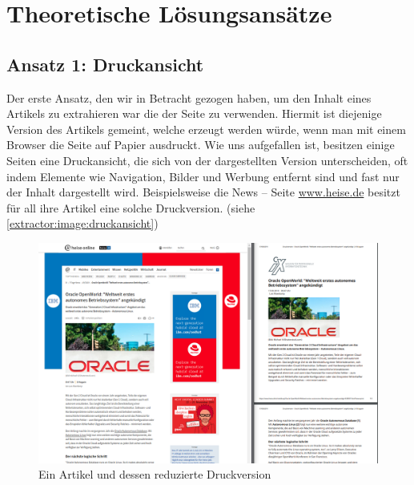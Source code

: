 \section{Theoretische Lösungsansätze}
\subsection[Die reduzierte Druckansicht]{Ansatz 1: Druckansicht}%
\label{extractor:ansatz:subsec1}
Der erste Ansatz, den wir in Betracht gezogen haben, um den Inhalt eines Artikels zu extrahieren war die  der Seite zu verwenden. Hiermit ist diejenige Version des Artikels gemeint, welche erzeugt werden würde, wenn man mit einem Browser die Seite auf Papier ausdruckt. Wie uns aufgefallen ist, besitzen einige Seiten eine Druckansicht, die sich von der dargestellten Version unterscheiden, oft indem Elemente wie Navigation, Bilder und Werbung entfernt sind und fast nur der Inhalt dargestellt wird. Beispielsweise die News – Seite \url{www.heise.de} besitzt für all ihre Artikel eine solche Druckversion. (siehe \autoref{extractor:image:druckansicht})

\begin{figure}[t]
	\centering
	\includegraphics[width=\linewidth]{images/druckansicht.png}
	\caption{Ein Artikel und dessen reduzierte Druckversion}
	\label{extractor:image:druckansicht}
\end{figure}

